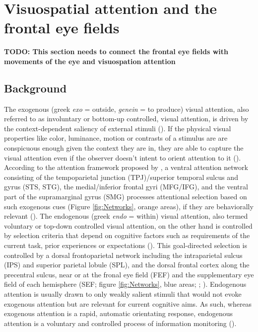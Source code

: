 \documentclass[a4paper, 12pt]{scrreprt}
\begin{document}
\section{Visuospatial attention and the frontal eye fields}
\textbf{TODO: This section needs to connect the frontal eye fields with movements of the eye and visuospation attention}


\subsection{Background}\label{section:visualattention}
The exogenous (greek \textit{exo} = outside, \textit{genein} = to produce) visual attention, also referred to as involuntary or bottom-up controlled, visual attention, is driven by the context-dependent saliency of external stimuli (\cite{itti2001computational}). If the physical visual properties like color, luminance, motion or contrasts of a stimulus are are conspicuous enough given the context they are in, they are able to capture the visual attention even if the observer doesn’t intent to orient attention to it (\cite{chica2013two}). According to the attention framework proposed by \textcite{corbetta2002control}, a ventral attention network consisting of the tempoparietal junction (TPJ)/superior temporal sulcus and gyrus (STS, STG), the medial/inferior frontal gyri (MFG/IFG), and the ventral part of the supramarginal gyrus (SMG) processes attentional selection based on such exogenous cues (Figure \ref{fig:Networks}, orange areas), if they are behaviorally relevant (\cite{downar2000multimodal}).
The endogenous (greek \textit{endo} = within) visual attention, also termed voluntary or top-down controlled visual attention, on the other hand is controlled by selection criteria that depend on cognitive factors such as requirements of the current task, prior experiences or expectations (\cite{itti2001computational}). This goal-directed selection is controlled by a dorsal frontoparietal network including the intraparietal sulcus (IPS) and superior parietal lobule (SPL), and the dorsal frontal cortex along the precentral sulcus, near or at the fronal eye field (FEF) and the supplementary eye field of each hemisphere (SEF; figure \ref{fig:Networks}, blue areas; \cite{corbetta2002control}; \cite{corbetta2008reorienting}). Endogenous attention is usually drawn to only weakly salient stimuli that would not evoke exogenous attention but are relevant for current cognitive aims. As such, whereas exogenous attention is a rapid, automatic orientating response, endogenous attention is a voluntary and controlled process of information monitoring (\cite{carrasco2011visual}).
\end{document}
